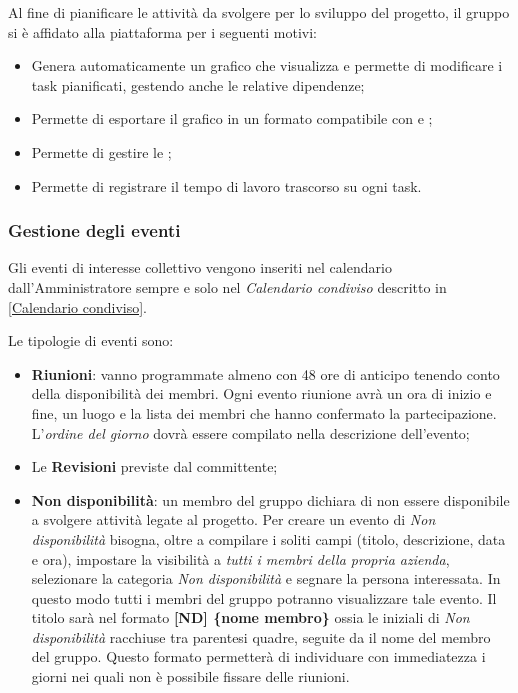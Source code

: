		Al fine di pianificare le attività da svolgere per lo sviluppo del progetto, il gruppo si è affidato alla piattaforma  per i seguenti motivi:
		\begin{itemize}
			\item Genera automaticamente un grafico  che visualizza e permette di modificare i task pianificati, gestendo anche le relative dipendenze;
			\item Permette di esportare il grafico  in un formato compatibile con  e ;
			\item Permette di gestire le ;
			\item Permette di registrare il tempo di lavoro trascorso su ogni task.
		\end{itemize}

		\subsubsection{Gestione degli eventi}
		
		Gli eventi di interesse collettivo vengono inseriti nel calendario dall'Amministratore sempre e solo nel \emph{Calendario condiviso} descritto in \ref{Calendario condiviso}.
		
		Le tipologie di eventi sono:
		\begin{itemize}
	  		\item \textbf{Riunioni}: vanno programmate almeno con 48 ore di anticipo tenendo conto della disponibilità dei membri. Ogni evento riunione avrà un ora di inizio e fine, un luogo e la lista dei membri che hanno confermato la partecipazione. L'\emph{ordine del giorno} dovrà essere compilato nella descrizione dell'evento;
	  		\item Le \textbf{Revisioni} previste dal committente;
	  		\item \textbf{Non disponibilità}: un membro del gruppo dichiara di non essere disponibile a svolgere attività legate al progetto. Per creare un evento di \emph{Non disponibilità} bisogna, oltre a compilare i soliti campi (titolo, descrizione, data e ora), impostare la visibilità a \emph{tutti i membri della propria azienda}, selezionare la categoria \emph{Non disponibilità} e segnare la persona interessata. In questo modo tutti i membri del gruppo \GroupName{} potranno visualizzare tale evento. 
	  		Il titolo sarà nel formato \textbf{[ND] \{nome membro\}} ossia le iniziali di \emph{Non disponibilità} racchiuse tra parentesi quadre, seguite da il nome del membro del gruppo. Questo formato permetterà di individuare con immediatezza i giorni nei quali non è possibile fissare delle riunioni.
		\end{itemize}
	
